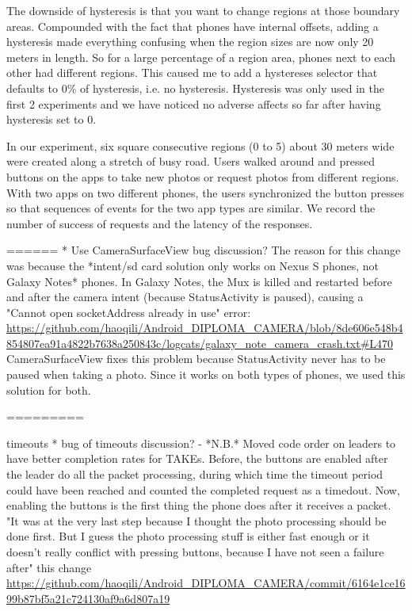 The downside of hysteresis is that you want to change regions at those boundary areas. Compounded with the fact that phones have internal offsets, adding a hysteresis made everything confusing when the region sizes are now only 20 meters in length. So for a large percentage of a region area, phones next to each other had different regions. This caused me to add a hystereses selector that defaults to 0\% of hysteresis, i.e. no hysteresis. Hysteresis was only used in the first 2 experiments and we have noticed no adverse affects so far after having hysteresis set to 0.

In our experiment, six square consecutive regions (0 to 5) about 30 meters wide were created along a stretch of busy road. Users walked around and pressed buttons on the apps to take new photos or request photos from different regions. With two apps on two different phones, the users synchronized the button presses so that sequences of events for the two app types are similar. We record the number of success of requests and the latency of the responses.




======
* Use CameraSurfaceView bug discussion?
   The reason for this change was because the *intent/sd card solution only works on Nexus S phones, not Galaxy Notes* phones. In Galaxy Notes, the Mux is killed and restarted before and after the camera intent (because StatusActivity is paused), causing a "Cannot open socketAddress already in use" error: {\url{https://github.com/haoqili/Android_DIPLOMA_CAMERA/blob/8de606e548b4854807ea91a4822b7638a250843c/logcats/galaxy_note_camera_crash.txt#L470}}
    CameraSurfaceView fixes this problem because StatusActivity never has to be paused when taking a photo. Since it works on both types of phones, we used this solution for both.

=========

timeouts
* bug of timeouts discussion?
    - *N.B.* Moved code order on leaders to have better completion rates for TAKEs. Before, the buttons are enabled after the leader do all the packet processing, during which time the timeout period could have been reached and counted the completed request as a timedout. Now, enabling the buttons is the first thing the phone does after it receives a packet.
        "It was at the very last step because I thought the photo processing should be done first. But I guess the photo processing stuff is either fast enough or it doesn't really conflict with pressing buttons, because I have not seen a failure after" this change
        {\url{https://github.com/haoqili/Android_DIPLOMA_CAMERA/commit/6164e1ce1699b87bf5a21c724130af9a6d807a19}}

